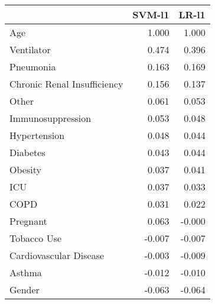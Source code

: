\begin{tabular}{lrr}
\toprule
{} &  SVM-l1 &  LR-l1 \\
\midrule
Age                         &   1.000 &  1.000 \\
Ventilator                  &   0.474 &  0.396 \\
Pneumonia                   &   0.163 &  0.169 \\
Chronic Renal Insufficiency &   0.156 &  0.137 \\
Other                       &   0.061 &  0.053 \\
Immunosuppression           &   0.053 &  0.048 \\
Hypertension                &   0.048 &  0.044 \\
Diabetes                    &   0.043 &  0.044 \\
Obesity                     &   0.037 &  0.041 \\
ICU                         &   0.037 &  0.033 \\
COPD                        &   0.031 &  0.022 \\
Pregnant                    &   0.063 & -0.000 \\
Tobacco Use                 &  -0.007 & -0.007 \\
Cardiovascular Disease      &  -0.003 & -0.009 \\
Asthma                      &  -0.012 & -0.010 \\
Gender                      &  -0.063 & -0.064 \\
\bottomrule
\end{tabular}
